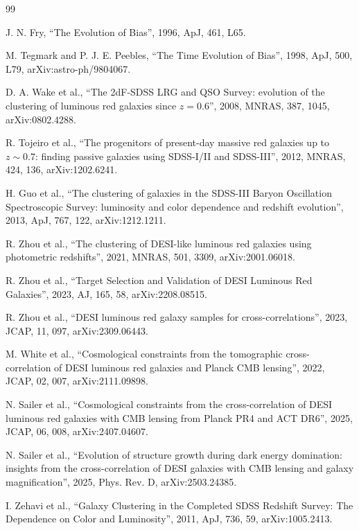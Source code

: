 \documentclass[11pt]{article}
\begin{document}
\begin{thebibliography}{99}
\label{sec:references}

J. N. Fry,
``The Evolution of Bias'',
1996, ApJ, 461, L65.

M. Tegmark and P. J. E. Peebles,
``The Time Evolution of Bias'',
1998, ApJ, 500, L79,
arXiv:astro-ph/9804067.

D. A. Wake et al.,
``The 2dF-SDSS LRG and QSO Survey: evolution of the clustering of
luminous red galaxies since $z = 0.6$'',
2008, MNRAS, 387, 1045,
arXiv:0802.4288.

R. Tojeiro et al.,
``The progenitors of present-day massive red galaxies up to
$z \sim 0.7$: finding passive galaxies using SDSS-I/II and SDSS-III'',
2012, MNRAS, 424, 136,
arXiv:1202.6241.

H. Guo et al.,
``The clustering of galaxies in the SDSS-III Baryon Oscillation
Spectroscopic Survey: luminosity and color dependence and redshift
evolution'',
2013, ApJ, 767, 122,
arXiv:1212.1211.

R. Zhou et al.,
``The clustering of DESI-like luminous red galaxies using photometric
redshifts'',
2021, MNRAS, 501, 3309,
arXiv:2001.06018.

R. Zhou et al.,
``Target Selection and Validation of DESI Luminous Red Galaxies'',
2023, AJ, 165, 58,
arXiv:2208.08515.

R. Zhou et al.,
``DESI luminous red galaxy samples for cross-correlations'',
2023, JCAP, 11, 097,
arXiv:2309.06443.

M. White et al.,
``Cosmological constraints from the tomographic cross-correlation of
DESI luminous red galaxies and Planck CMB lensing'',
2022, JCAP, 02, 007,
arXiv:2111.09898.

N. Sailer et al.,
``Cosmological constraints from the cross-correlation of DESI
luminous red galaxies with CMB lensing from Planck PR4 and ACT DR6'',
2025, JCAP, 06, 008,
arXiv:2407.04607.

N. Sailer et al.,
``Evolution of structure growth during dark energy domination:
insights from the cross-correlation of DESI galaxies with CMB lensing
and galaxy magnification'',
2025, Phys. Rev. D,
arXiv:2503.24385.

I. Zehavi et al.,
``Galaxy Clustering in the Completed SDSS Redshift Survey: The
Dependence on Color and Luminosity'',
2011, ApJ, 736, 59,
arXiv:1005.2413.


\end{thebibliography}
\end{document}
